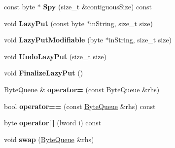 \begin{DoxyCompactItemize}
\item 
\hypertarget{class_byte_queue_afaafc3a26959d14ce36ec13e698ac6d8}{
const byte $\ast$ {\bfseries Spy} (size\_\-t \&contiguousSize) const }
\label{class_byte_queue_afaafc3a26959d14ce36ec13e698ac6d8}

\item 
\hypertarget{class_byte_queue_a127af9acc2ad34922953abd30447afa1}{
void {\bfseries LazyPut} (const byte $\ast$inString, size\_\-t size)}
\label{class_byte_queue_a127af9acc2ad34922953abd30447afa1}

\item 
\hypertarget{class_byte_queue_ac90c40206fc9e8ae2c4fc984347a360a}{
void {\bfseries LazyPutModifiable} (byte $\ast$inString, size\_\-t size)}
\label{class_byte_queue_ac90c40206fc9e8ae2c4fc984347a360a}

\item 
\hypertarget{class_byte_queue_a9c7e4d3fa01a23314b7809885b770d23}{
void {\bfseries UndoLazyPut} (size\_\-t size)}
\label{class_byte_queue_a9c7e4d3fa01a23314b7809885b770d23}

\item 
\hypertarget{class_byte_queue_a6d004338c41f8e04a723c7adab5d0895}{
void {\bfseries FinalizeLazyPut} ()}
\label{class_byte_queue_a6d004338c41f8e04a723c7adab5d0895}

\item 
\hypertarget{class_byte_queue_a38c97a037982729f799bf7a186a5837d}{
\hyperlink{class_byte_queue}{ByteQueue} \& {\bfseries operator=} (const \hyperlink{class_byte_queue}{ByteQueue} \&rhs)}
\label{class_byte_queue_a38c97a037982729f799bf7a186a5837d}

\item 
\hypertarget{class_byte_queue_a81690c024725d924c0dd9d0b7f8a689b}{
bool {\bfseries operator==} (const \hyperlink{class_byte_queue}{ByteQueue} \&rhs) const }
\label{class_byte_queue_a81690c024725d924c0dd9d0b7f8a689b}

\item 
\hypertarget{class_byte_queue_a1da7e83ecae38d93f21d99f061c91c89}{
byte {\bfseries operator\mbox{[}$\,$\mbox{]}} (lword i) const }
\label{class_byte_queue_a1da7e83ecae38d93f21d99f061c91c89}

\item 
\hypertarget{class_byte_queue_adcf03598210a516afc86abfb51ce5eb8}{
void {\bfseries swap} (\hyperlink{class_byte_queue}{ByteQueue} \&rhs)}
\label{class_byte_queue_adcf03598210a516afc86abfb51ce5eb8}

\end{DoxyCompactItemize}
